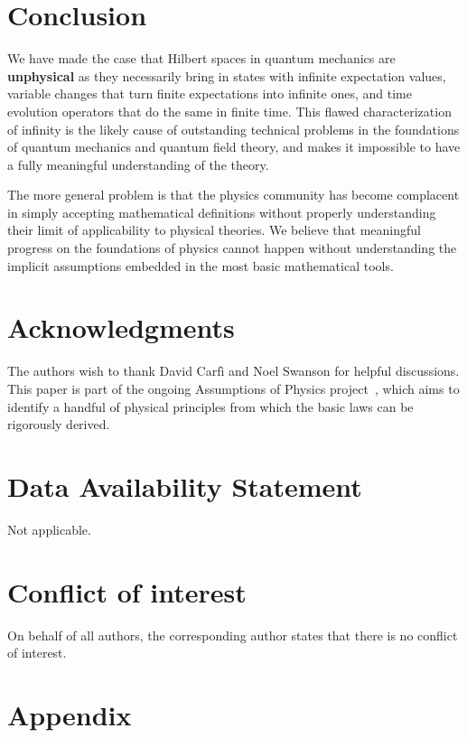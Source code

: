 \documentclass[10pt,twocolumn, nofootinbib]{revtex4-2}
\begin{document}
\section{Conclusion}

We have made the case that Hilbert spaces in quantum mechanics are \textbf{unphysical} as they necessarily bring in states with infinite expectation values, variable changes that turn finite expectations into infinite ones, and time evolution operators that do the same in finite time. This flawed characterization of infinity is the likely cause of outstanding technical problems in the foundations of quantum mechanics and quantum field theory, and makes it impossible to have a fully meaningful understanding of the theory.

The more general problem is that the physics community has become complacent in simply accepting mathematical definitions without properly understanding their limit of applicability to physical theories. We believe that meaningful progress on the foundations of physics cannot happen without understanding the implicit assumptions embedded in the most basic mathematical tools.

\section*{Acknowledgments}
The authors wish to thank David Carf\`{i} and Noel Swanson for helpful discussions.  This paper is part of the ongoing Assumptions of Physics project~\cite{aop-book}, which aims to identify a handful of physical principles from which the basic laws can be rigorously derived.


\section*{Data Availability Statement}
Not applicable.


\section*{Conflict of interest}
On behalf of all authors, the corresponding author states that there is no conflict of interest. 



\newcommand{\pj}[1] {\underbar{$#1$}}

\section*{Appendix}
\end{document}
